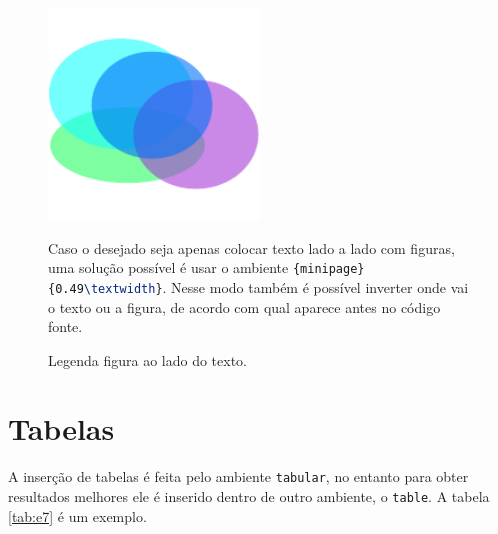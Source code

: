     \begin{figure}[htb]
        \centering
        \begin{minipage}{0.49\textwidth}
            \centering
            \includegraphics[width=0.5\textwidth]{images/figure.pdf}
            \caption{Legenda figura ao lado do texto.}
            \label{fig:texto_do_lado}
        \end{minipage}
        \hfill
        \begin{minipage}{0.49\textwidth}
            \linespread{1.0}\selectfont

            Caso o desejado seja apenas colocar texto lado a lado com figuras, uma solução possível é usar o ambiente \lstinline[language=TeX,style=code]|{minipage}{0.49\textwidth}|.
            Nesse modo também é possível inverter onde vai o texto ou a figura, de acordo com qual aparece antes no código fonte.

        \end{minipage}
    \end{figure}


\section{Tabelas}
\label{sec:tabelas}

    A inserção de tabelas é feita pelo ambiente \lstinline[language=TeX, style=Code]|tabular|, no entanto para obter resultados melhores ele é inserido dentro de outro ambiente, o \lstinline[language=TeX, style=Code]|table|.
    A tabela \ref{tab:e7} é um exemplo.


